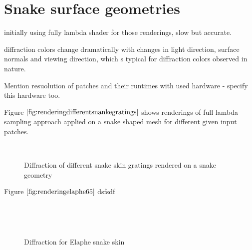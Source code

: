 \section{Snake surface geometries}
\label{sec:snakegeomrenderings}
initially using fully lambda shader for those renderings, slow but accurate.

diffraction colors change dramatically with changes in light direction, surface normals and viewing direction, which s typical for diffraction colors observed in nature.

Mention resuolution of patches and their runtimes with used hardware - specify this hardware too.


Figure $\ref{fig:renderingdifferentsnankegratings}$ shows renderings of full lambda sampling approach applied on a snake shaped mesh for different given input patches.

\begin{figure}[H]
  \centering
~
~
  
\caption{Diffraction of different snake skin gratings rendered on a snake geometry}
\label{fig:renderingdifferentsnankegratings}
\end{figure}


Figure $\ref{fig:renderingelaphe65}$ dsfsdf

\begin{figure}[H]
  \centering
~

~
~ 
  
\caption{Diffraction for Elaphe snake skin}
\label{fig:renderingelaphe65}
\end{figure}


